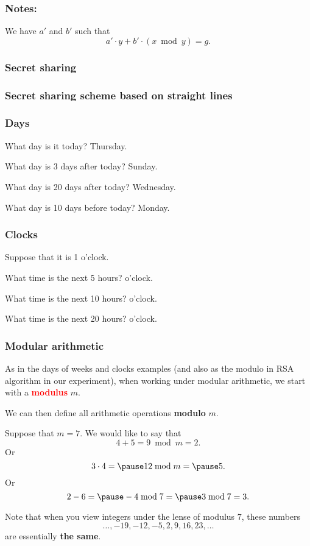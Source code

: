 \begin{frame}
  \frametitle{Notes:}

  We have $a'$ and $b'$ such that
  \[
  a'\cdot y + b'\cdot(x \bmod y) = g.
  \]

  \vspace{3in}
\end{frame}

\begin{frame}
  \frametitle{Secret sharing}
\end{frame}

\begin{frame}
  \frametitle{Secret sharing scheme based on straight lines}
\end{frame}

\begin{frame}
  \frametitle{Days}

  What day is it today? \pause Thursday.

  \pause
  What day is 3 days after today? \pause Sunday.
  
  \pause
  What day is 20 days after today? \pause Wednesday.

  \pause
  What day is 10 days before today? \pause Monday.
\end{frame}

\begin{frame}
  \frametitle{Clocks}

  Suppose that it is 1 o'clock.

  \pause
  What time is the next 5 hours?   o'clock.
  
  \pause
  What time is the next 10 hours?   o'clock.
  
  \pause
  What time is the next 20 hours?   o'clock.
  
\end{frame}

\begin{frame}
  \frametitle{Modular arithmetic}

  As in the days of weeks and clocks examples (and also as the modulo
  in RSA algorithm in our experiment), when working under modular
  arithmetic, we start with a \textcolor{red}{\bf modulus} $m$.

  \vspace{0.1in}
  \pause
  We can then define all arithmetic operations {\bf modulo} $m$.

  \vspace{0.1in}
  \pause
  Suppose that $m=7$.  We would like to say that
  {\small
  \[
  4 + 5 = 9 \bmod m= 2.
  \]
  Or
  \[
  3\cdot 4 = \pause 12 \bmod m = \pause 5.
  \]
  Or
  \[
  2 - 6 = \pause -4 \bmod 7 = \pause 3 \bmod 7 = 3.
  \]
  }

  \pause
  Note that when you view integers under the lense of modulus $7$,
  these numbers
  \[
  \ldots,-19,-12,-5,2,9,16,23,\ldots
  \]
  are essentially {\bf the same}.
\end{frame}

